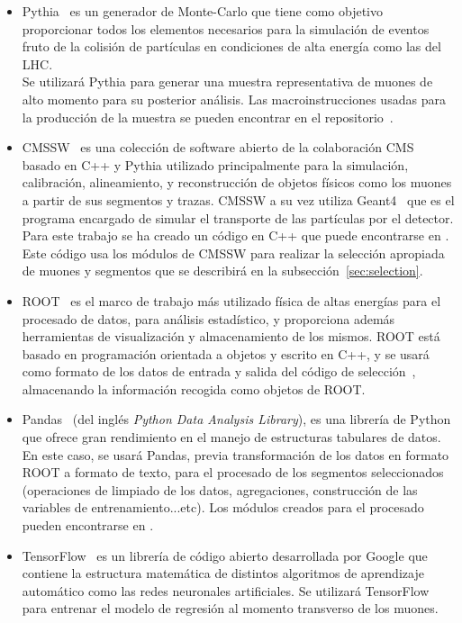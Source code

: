 \begin{itemize}

\item Pythia~\cite{Sjstrand2008ABI} es un generador de Monte-Carlo que tiene como objetivo proporcionar todos los elementos necesarios para la simulaci\'on de eventos fruto de la colisi\'on de part\'iculas en condiciones de alta energ\'ia como las del LHC. \\
Se utilizar\'a Pythia para generar una muestra representativa de muones de alto momento para su posterior an\'alisis. Las macroinstrucciones usadas para la producci\'on de la muestra se pueden encontrar en el repositorio~\cite{generator}.

\item CMSSW~\cite{cmssw} es una colecci\'on de software abierto de la colaboraci\'on CMS basado en C++ y Pythia utilizado principalmente para la simulaci\'on, calibraci\'on, alineamiento, y reconstrucci\'on de objetos f\'isicos como los muones a partir de sus segmentos y trazas. CMSSW a su vez utiliza Geant4~\cite{Agostinelli:2002hh} que es el programa encargado de simular el transporte de las partículas por el detector. \\
Para este trabajo se ha creado un c\'odigo en C++ que puede encontrarse en \cite{analyzer}. Este c\'odigo usa los m\'odulos de CMSSW para realizar la selecci\'on apropiada de muones y segmentos que se describir\'a en la subsecci\'on~\ref{sec:selection}. 

\item ROOT~\cite{root} es el marco de trabajo m\'as utilizado f\'isica de altas energ\'ias para el procesado de datos, para an\'alisis estad\'istico, y proporciona adem\'as herramientas de visualizaci\'on y almacenamiento de los mismos. ROOT est\'a basado en programaci\'on orientada a objetos y escrito en C++, y se usar\'a como formato de los datos de entrada y salida del c\'odigo de selecci\'on~\cite{analyzer}, almacenando la informaci\'on recogida como objetos de ROOT.

\item Pandas~\cite{mckinney-proc-scipy-2010} (del ingl\'es \textit{Python Data Analysis Library}), es una librer\'ia de Python que ofrece gran rendimiento en el manejo de estructuras tabulares de datos. \\
En este caso, se usar\'a Pandas, previa transformaci\'on de los datos en formato ROOT a formato de texto, para el procesado de los segmentos seleccionados (operaciones de limpiado de los datos, agregaciones, construcci\'on de las variables de entrenamiento...etc). Los m\'odulos creados para el procesado pueden encontrarse en \cite{processor}.

\item TensorFlow~\cite{tensorflow2015-whitepaper} es un librer\'ia de c\'odigo abierto desarrollada por Google que contiene la estructura matem\'atica de distintos algoritmos de aprendizaje autom\'atico como las redes neuronales artificiales. Se utilizar\'a TensorFlow para entrenar el modelo de regresi\'on al momento transverso de los muones.

\end{itemize}


